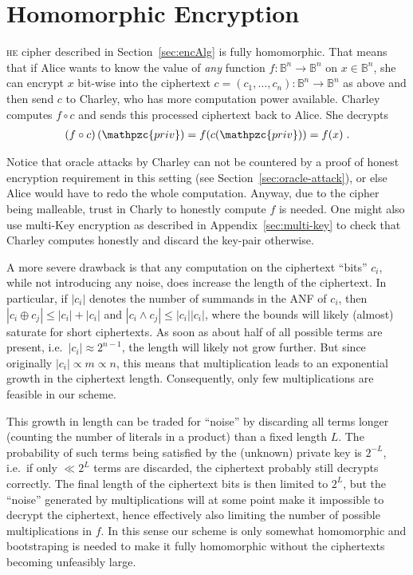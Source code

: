 \documentclass[final,journal,compsoc]{IEEEtran}
\newcommand{\priv}{\mathpzc{priv}}
\begin{document}
\section{Homomorphic Encryption\label{sec:homom-encrypt}}
 \textsc{he} cipher described in Section~\ref{sec:encAlg} is fully
 homomorphic. That means that if Alice wants to know the value of \emph{any} function $f: \mathbb B^n
 \to \mathbb B^n$ on $x \in
 \mathbb B^n$, she can encrypt $x$ bit-wise into the ciphertext
 $c=(c_1,\ldots,c_n) : \mathbb B^n \to \mathbb B^n$ as
 above and then send $c$ to Charley, who has more computation power
 available. Charley computes $f \circ c$ and sends this processed
 ciphertext back to Alice. She decrypts
\begin{align}
\label{eq:homomorph}
\left(f \circ c\right)(\priv) = f(c(\priv)) = f(x) \;.
\end{align}

Notice that oracle attacks by Charley can not be
countered by a proof of honest encryption requirement in this setting (see
Section~\ref{sec:oracle-attack}), or else Alice would have to redo the whole
computation. Anyway, due to the cipher being malleable,
trust in Charly to honestly compute $f$ is needed. 
One might also use multi-Key encryption
as described in Appendix~\ref{sec:multi-key} to check that Charley computes
honestly and discard the key-pair otherwise.

A more severe drawback is that any computation on the ciphertext ``bits''
$c_i$, while not introducing any noise, does increase the length of
the ciphertext. In particular, if $|c_i|$ denotes the number of summands
in the ANF of $c_i$, then 
$|c_i \oplus c_j| \leq |c_i| + |c_i|$ and $|c_i \wedge c_j| \leq |c_i| |c_i|$,
where the bounds will likely (almost) saturate for short ciphertexts. As
soon as about half of all possible terms are present, i.e.\ $|c_i|
\approx 2^{n-1}$, the length will likely not grow further. But since
originally $|c_i| \propto m \propto n$,
this means that multiplication leads to an exponential growth in the
ciphertext length. Consequently, only few multiplications are feasible in our scheme.

This growth in length can be traded for ``noise'' by discarding all
terms longer (counting the number of literals in a product) than a
fixed length $L$. The probability of such terms being satisfied by
the (unknown) private key is $2^{-L}$, i.e.\ if only $\ll 2^L$ terms
are discarded, the ciphertext probably still decrypts correctly. The final length
of the ciphertext bits is then limited to $2^L$, but the ``noise''
generated by multiplications will at some point make it impossible to
decrypt the ciphertext, hence effectively also limiting the number of
possible multiplications in $f$.
In this sense our scheme is only somewhat homomorphic and bootstraping
is needed to make it fully homomorphic
without the ciphertexts becoming unfeasibly large.
\end{document}
